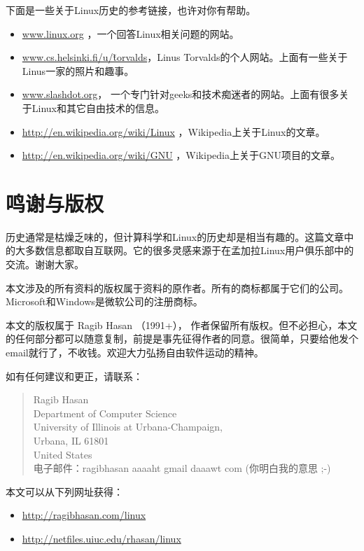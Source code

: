 \documentclass[12pt,a4paper]{article}
\begin{document}
  下面是一些关于Linux历史的参考链接，也许对你有帮助。
\begin{itemize}
\item \href{http://www.linux.org}{www.linux.org} ，一个回答Linux相关问题的网站。
\item \href{http://www.cs.helsinki.fi/u/~torvalds}{www.cs.helsinki.fi/u/\~torvalds}，Linus Torvalds的个人网站。上面有一些关于Linus一家的照片和趣事。
\item \href{http://www.slashdot.org}{www.slashdot.org}， 一个专门针对geeks和技术痴迷者的网站。上面有很多关于Linux和其它自由技术的信息。
\item \href{http://en.wikipedia.org/wiki/Linux}{http://en.wikipedia.org/wiki/Linux} ，Wikipedia上关于Linux的文章。
\item \href{http://en.wikipedia.org/wiki/GNU}{http://en.wikipedia.org/wiki/GNU} ，Wikipedia上关于GNU项目的文章。
\end{itemize}
\section{鸣谢与版权}
\label{sec-9}

  历史通常是枯燥乏味的，但计算科学和Linux的历史却是相当有趣的。这篇文章中的大多数信息都取自互联网。它的很多灵感来源于在孟加拉Linux用户俱乐部中的交流。谢谢大家。
  
  本文涉及的所有资料的版权属于资料的原作者。所有的商标都属于它们的公司。 Microsoft和Windows是微软公司的注册商标。

  本文的版权属于 Ragib Hasan （1991+）， 作者保留所有版权。但不必担心，本文的任何部分都可以随意复制，前提是事先征得作者的同意。很简单，只要给他发个email就行了，不收钱。欢迎大力弘扬自由软件运动的精神。

  如有任何建议和更正，请联系：
\begin{verse}
Ragib Hasan\\
Department of Computer Science\\
University of Illinois at Urbana-Champaign,\\
Urbana, IL 61801\\
United States\\
电子邮件：ragibhasan aaaaht gmail daaawt com (你明白我的意思 ;-)\\
\end{verse}

  本文可以从下列网址获得：
\begin{itemize}
\item \href{http://ragibhasan.com/linux}{http://ragibhasan.com/linux}
\item \href{http://netfiles.uiuc.edu/rhasan/linux}{http://netfiles.uiuc.edu/rhasan/linux}
\end{itemize}
\end{document}
